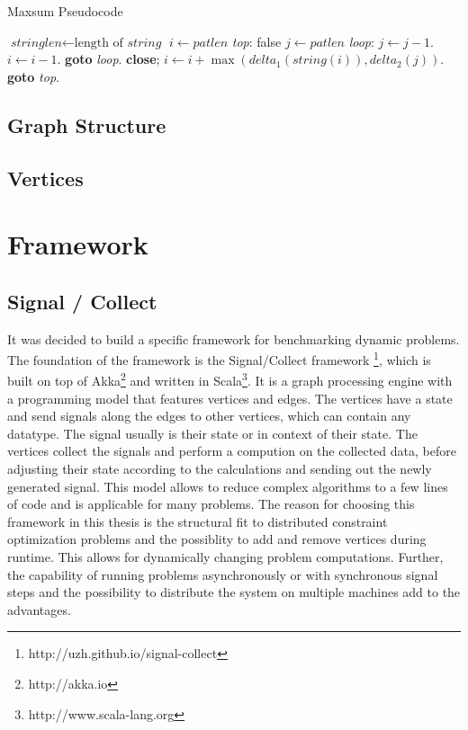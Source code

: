     \begin{algorithm}
\caption{Maxsum Pseudocode}\label{euclid}
\begin{algorithmic}[3]
\State $\textit{stringlen} \gets \text{length of }\textit{string}$
\State $i \gets \textit{patlen}$
\BState \emph{top}:
 \Return false
\EndIf
\State $j \gets \textit{patlen}$
\BState \emph{loop}:
\State $j \gets j-1$.
\State $i \gets i-1$.
\State \textbf{goto} \emph{loop}.
\State \textbf{close};
\EndIf
\State $i \gets i+\max(\textit{delta}_1(\textit{string}(i)),\textit{delta}_2(j))$.
\State \textbf{goto} \emph{top}.
\EndProcedure
\end{algorithmic}
\end{algorithm}

\subsection{Graph Structure}
\subsection{Vertices}

\section{Framework}

\subsection{Signal / Collect}

It was decided to build a specific framework for benchmarking dynamic problems. The foundation of the framework is the Signal/Collect framework \cite{Stutz2010}\footnote{http://uzh.github.io/signal-collect}, which is built on top of Akka\footnote{http://akka.io} and written in Scala\footnote{http://www.scala-lang.org}. It is a graph processing engine with a programming model that features vertices and edges. The vertices have a state and send signals along the edges to other vertices, which can contain any datatype. The signal usually is their state or in context of their state. The vertices collect the signals and perform a compution on the collected data, before adjusting their state according to the calculations and sending out the newly generated signal.  This model allows to reduce complex algorithms to a few lines of code and is applicable for many problems. The reason for choosing this framework in this thesis is the structural fit to distributed constraint optimization problems and the possiblity to add and remove vertices during runtime. This allows for dynamically changing problem computations. Further, the capability of running problems asynchronously or with synchronous signal steps and the possibility to distribute the system on multiple machines add to the advantages.


